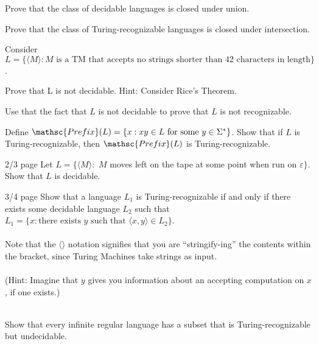 \documentclass[solution, letterpaper]{cscie121}
\begin{document}


Prove that the class of decidable languages is closed under union. 

\begin{solution}
\end{solution}


Prove that the class of Turing-recognizable languages is closed under intersection.

\begin{solution}
\end{solution}

\subproblem Consider $L = \{\langle M \rangle: M \text{ is a TM that accepts no strings shorter than } 42 \text{ characters in length}\}$. 
 
Prove that L is not decidable. Hint: Consider Rice's Theorem.

\subproblem Use that the fact that $L$ is not decidable to prove that $L$ is not recognizable.

\begin{solution}
\end{solution}


Define $\mathsc{Prefix}(L) = \{ x : xy \in L \text{ for some }y \in \Sigma^*\}$. Show that if $L$ is Turing-recognizable, then $\mathsc{Prefix}(L)$ is Turing-recognizable.

\begin{solution}
\end{solution}

 {2/3 page}
Let $L=\{\langle M\rangle:$ $M$ moves left on the tape at some point when run on $\varepsilon\}$. Show that $L$ is decidable.

\begin{solution}
\end{solution}

 {3/4 page}
Show that a language $L_1$ is Turing-recognizable if and only if there exists some decidable language $L_2$ such that $L_1 = \{x : \text{there exists $y$ such that $\langle x,y \rangle \in L_2$}\}$. \\ \\
Note that the $\langle \rangle$ notation signifies that you are ``stringify-ing'' the contents within the bracket, since Turing Machines take strings as input. \\ \\ 
(Hint: Imagine that $y$ gives you information about an accepting computation on $x$, if one exists.) \\ \\
\begin{solution}
\end{solution}

Show that every infinite regular language has a
subset that is Turing-recognizable but undecidable.

\begin{solution}
\end{solution}
\end{document}
